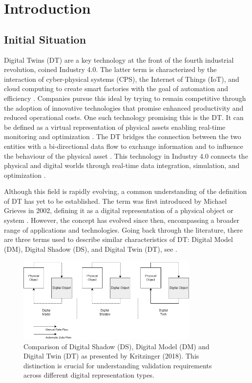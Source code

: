 \chapter{Introduction}
\label{chap:introduction}

\section{Initial Situation}
Digital Twins (DT) are a key technology at the front of the fourth industrial revolution, coined Industry 4.0.
The latter term is characterized by the interaction of cyber-physical systems (CPS), the Internet of Things (IoT), and cloud computing to create smart factories with the goal of automation and efficiency \parencite{Oztemel2020}. Companies pursue this ideal by trying to remain competitive through the adoption of innovative technologies that promise enhanced productivity and reduced operational costs. One such technology promising this is the DT. It can be defined as a virtual representation of physical assets enabling real-time monitoring and optimization \parencite{Tao2018ijamt}. The DT bridges the connection between the two entities with a bi-directional data flow to exchange information and to influence the behaviour of the physical asset \parencite{grieves2014digital}. This technology in Industry 4.0 connects the physical and digital worlds through real-time data integration, simulation, and optimization \parencite{judijanto2024trends}.

Although this field is rapidly evolving, a common understanding of the definition of DT has yet to be established. The term was first introduced by Michael Grieves in 2002, defining it as a digital representation of a physical object or system \parencite{grieves2014digital}. However, the concept has evolved since then, encompassing a broader range of applications and technologies. Going back through the literature, there are three terms used to describe similar characteristics of DT: Digital Model (DM), Digital Shadow (DS), and Digital Twin (DT), see  \parencite{jones2020characterising,Zhang2021jmsy}.

\begin{figure}[htbp]
  \centering
  \includegraphics[width=0.8\textwidth]{figures/kritzinger.png}
  \caption{Comparison of Digital Shadow (DS), Digital Model (DM) and Digital Twin (DT) as presented by Kritzinger (2018). This distinction is crucial for understanding validation requirements across different digital representation types.}
  \label{fig:Kritzinger}
\end{figure}

